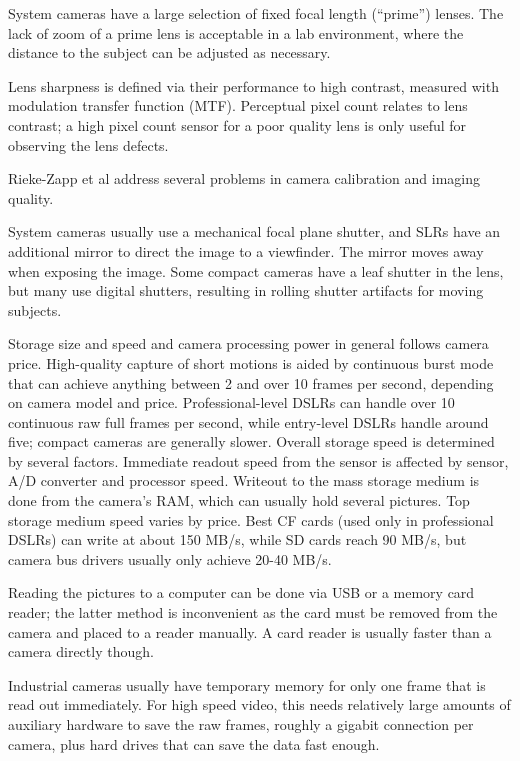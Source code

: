 System cameras have a large selection of fixed focal length (``prime'') lenses.
The lack of zoom of a prime lens is acceptable in a lab environment, where the distance to the subject can be adjusted as necessary.

Lens sharpness is defined via their performance to high contrast, measured with modulation transfer function (MTF).
Perceptual pixel count relates to lens contrast; a high pixel count sensor for a poor quality lens is only useful for observing the lens defects.

Rieke-Zapp et al \cite{rieke2009evaluation} address several problems in camera calibration and imaging quality.


System cameras usually use a mechanical focal plane shutter, and SLRs have an additional mirror to direct the image to a viewfinder.
The mirror moves away when exposing the image.
Some compact cameras have a leaf shutter in the lens, but many use digital shutters, resulting in rolling shutter artifacts for moving subjects.

Storage size and speed and camera processing power in general follows camera price.
High-quality capture of short motions is aided by continuous burst mode that can achieve anything between 2 and over 10 frames per second, depending on camera model and price.
Professional-level DSLRs can handle over 10 continuous raw full frames per second, while entry-level DSLRs handle around five;
compact cameras are generally slower.
Overall storage speed is determined by several factors.
Immediate readout speed from the sensor is affected by sensor, A/D converter and processor speed.
Writeout to the mass storage medium is done from the camera's RAM, which can usually hold several pictures.
Top storage medium speed varies by price.
Best CF cards (used only in professional DSLRs) can write at about 150 MB/s, while SD cards reach 90 MB/s, but camera bus drivers usually only achieve 20-40 MB/s. %

Reading the pictures to a computer can be done via USB or a memory card reader; the latter method is inconvenient as the card must be removed from the camera and placed to a reader manually.
A card reader is usually faster than a camera directly though.

Industrial cameras usually have temporary memory for only one frame that is read out immediately.
For high speed video, this needs relatively large amounts of auxiliary hardware to save the raw frames, roughly a gigabit connection per camera, plus hard drives that can save the data fast enough.

